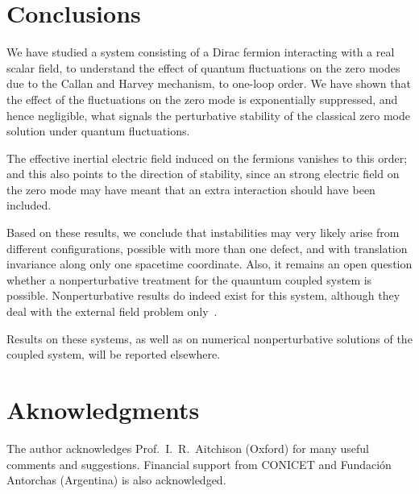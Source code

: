 \documentclass[a4paper,12pt]{article}
\begin{document}
\section{Conclusions}\label{sec:conc}
%
We have studied a system consisting of a Dirac fermion interacting 
with a real scalar field, to understand the effect of quantum 
fluctuations on the zero modes due to the Callan and
Harvey mechanism, to one-loop order.
We have shown that the effect of the fluctuations on the zero mode
is exponentially suppressed, and hence negligible, what signals the
perturbative stability of the classical zero mode solution under 
quantum fluctuations.

The effective inertial electric field induced on the fermions vanishes
to this order; and this also points to the direction of stability, since
an strong electric field on the zero mode may have meant that an
extra interaction should have been included.

Based on these results, we conclude that instabilities may very
likely arise from different configurations, possible with more than
one defect, and with translation invariance along only one spacetime
coordinate. Also, it remains an open question whether a nonperturbative
treatment for the quauntum coupled system is possible.  Nonperturbative
results do indeed exist for this system, although they deal with the 
external field problem only~\cite{DaRold:2001ri}.

Results on these systems, as well as on numerical nonperturbative 
solutions of the coupled system, will be reported elsewhere.
 
%
\section*{Aknowledgments}
The author acknowledges Prof.~I.~R.~Aitchison (Oxford) for many useful 
comments and suggestions.
Financial support from CONICET and Fundaci{\'o}n Antorchas (Argentina) is
also acknowledged.
%
\end{document}

